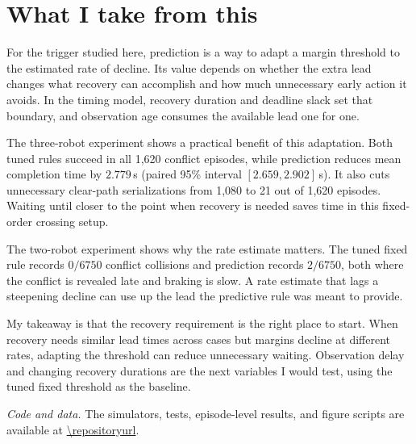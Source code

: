 \section{What I take from this}
\label{sec:conclusion}

For the trigger studied here, prediction is a way to adapt a margin threshold
to the estimated rate of decline.  Its value depends on whether the extra lead
changes what recovery can accomplish and how much unnecessary early action it
avoids.  In the timing model, recovery duration and deadline slack set that
boundary, and observation age consumes the available lead one for one.

The three-robot experiment shows a practical benefit of this adaptation.  Both
tuned rules succeed in all 1,620 conflict episodes, while prediction reduces
mean completion time by $2.779$\,s (paired 95\% interval
$[2.659,2.902]$\,s).  It also cuts unnecessary clear-path serializations from
1,080 to 21 out of 1,620 episodes.  Waiting until closer to the point when
recovery is needed saves time in this fixed-order crossing setup.

The two-robot experiment shows why the rate estimate matters.  The tuned fixed
rule records $0/6750$ conflict collisions and prediction records $2/6750$, both
where the conflict is revealed late and braking is slow.  A rate estimate that
lags a steepening decline can use up the lead the predictive rule was meant to
provide.

My takeaway is that the recovery requirement is the right place to start.
When recovery needs similar lead times across cases but margins decline at
different rates, adapting the threshold can reduce unnecessary waiting.
Observation delay and changing recovery durations are the next variables I
would test, using the tuned fixed threshold as the baseline.

\emph{Code and data.}  The simulators, tests, episode-level results, and figure
scripts are available at \url{\repositoryurl}.
